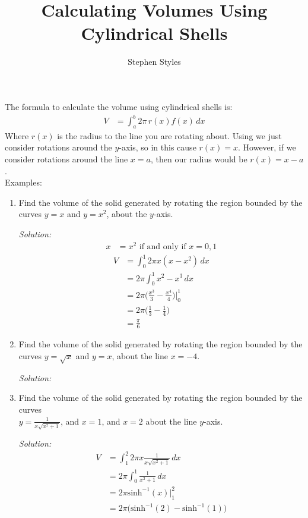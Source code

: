 \documentclass[16pt]{article}
\title{Calculating Volumes Using Cylindrical Shells}
\author{Stephen Styles}
\theoremstyle{remark}
\begin{document}
\maketitle

The formula to calculate the volume using cylindrical shells is:
\begin{align*}
V&= \int_a^b 2\pi\, r(x) f(x) \, dx
\end{align*}
Where $r(x)$ is the radius to the line you are rotating about. Using we just consider rotations around the $y$-axis, so in this cause $r(x)=x$. However, if we consider rotations around the line $x=a$, then our radius would be $r(x)=x-a$.\\

Examples:
\begin{enumerate}
\item Find the volume of the solid generated by rotating the region bounded by the curves $y=x$ and $y=x^2$, about the $y$-axis.
\begin{mdframed}[style=TheoremFrame]
\textit{Solution:}
\begin{align*}
x&=x^2 \text{ if and only if } x=0,1
\end{align*}
\begin{align*}
V&= \int_0^1 2 \pi x (x-x^2) \, dx\\
&= 2 \pi \int_0^1 x^2 - x^3 \, dx\\
&= 2 \pi \bigg(\frac{x^3}{3} - \frac{x^4}{4}\bigg) \bigg|_0^1\\
&= 2 \pi \bigg(\frac{1}{3} - \frac{1}{4} \bigg)\\
&= \frac{\pi}{6}
\end{align*}
\end{mdframed}
\item Find the volume of the solid generated by rotating the region bounded by the curves $y=\sqrt{x}$ and $y=x$, about the line $x=-4$.
\begin{mdframed}[style=TheoremFrame]
\textit{Solution:}\\

\end{mdframed}
\item Find the volume of the solid generated by rotating the region bounded by the curves\\ $y=\frac{1}{x\sqrt{x^2+1}}$, and $x=1$, and $x=2$ about the line $y$-axis.
\begin{mdframed}[style=TheoremFrame]
\textit{Solution:}
\begin{align*}
V&= \int_1^2 2 \pi x \frac{1}{x\sqrt{x^2+1}} \, dx\\
&= 2\pi \int_0^1 \frac{1}{x^2+1} \, dx \\
&= 2\pi \text{sinh}^{-1}(x) \bigg|_1^2\\
&= 2\pi \big(\text{sinh}^{-1}(2)-\text{sinh}^{-1}(1)\big)
\end{align*}
\end{mdframed}
\end{enumerate}
\end{document}
